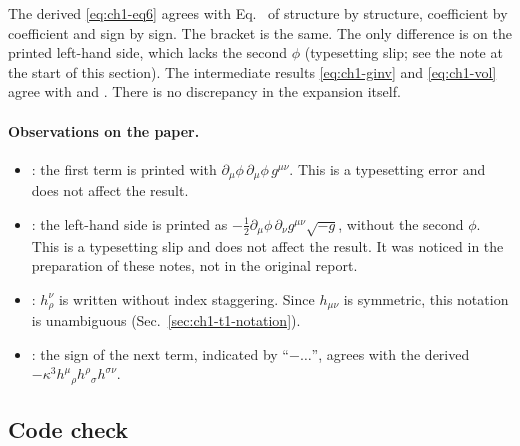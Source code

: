 \begin{resultbox}
The derived \eqref{eq:ch1-eq6} agrees with Eq.~ of \PI{} structure by
structure, coefficient by coefficient and sign by sign. The bracket is the
same. The only difference is on the printed left-hand side, which lacks the
second $\phi$ (typesetting slip; see the note at the start of this section).
The intermediate results \eqref{eq:ch1-ginv} and \eqref{eq:ch1-vol} agree with
 and . There is no discrepancy in the expansion itself.
\end{resultbox}

\paragraph{Observations on the paper.}
\begin{itemize}[leftmargin=1.4em]
\item {}: the first term is printed with
$\partial_\mu\phi\,\partial_\mu\phi\,g^{\mu\nu}$. This is a typesetting error
and does not affect the result.
\item {}: the left-hand side is printed as
$-\tfrac12\partial_\mu\phi\,\partial_\nu g^{\mu\nu}\sqrt{-g}$, without the second
$\phi$. This is a typesetting slip and does not affect the result. It was
noticed in the preparation of these notes, not in the original report.
\item {}: $h^\nu_\rho$ is written without index staggering. Since
$h_{\mu\nu}$ is symmetric, this notation is unambiguous
(Sec.~\ref{sec:ch1-t1-notation}).
\item {}: the sign of the next term, indicated by ``$-\ldots$'', agrees with
the derived $-\kappa^3h^\mu{}_\rho h^\rho{}_\sigma h^{\sigma\nu}$.
\end{itemize}

\subsection{Code check}
\label{sec:ch1-t1-code}


